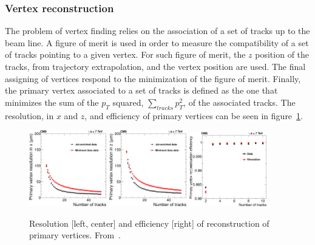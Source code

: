 \subsubsection{Vertex reconstruction}

The problem of vertex finding relies on the association of a set of tracks up to the beam line. A figure of merit is used in order to measure the compatibility of a set of tracks pointing to a given vertex. For such figure of merit, the $z$ position of the tracks, from trajectory extrapolation, and the vertex position are used. The final assigning of vertices respond to the minimization of the figure of merit. Finally, the primary vertex associated to a set of tracks is defined as the one that minimizes the sum of the $p_{T}$ squared, $\sum_{tracks}p_{T}^{2}$, of the associated tracks. The resolution, in $x$ and $z$, and efficiency of primary vertices can be seen in figure~\ref{fig:VertexRec}.

\begin{figure}[!Hhtbp]
  \begin{center}
    \includegraphics[width=0.3\textwidth]{figs/PrimaryVertexResolutionX.png}
    \includegraphics[width=0.3\textwidth]{figs/PrimaryVertexResolutionZ.png}
    \includegraphics[width=0.3\textwidth]{figs/PrimaryVertexTagAndProbeEfficiency.png}
    \caption{Resolution [left, center] and efficiency [right] of reconstruction of primary vertices. From~\cite{Chatrchyan:2014fea}.}
    \label{fig:VertexRec}
  \end{center}
\end{figure}

